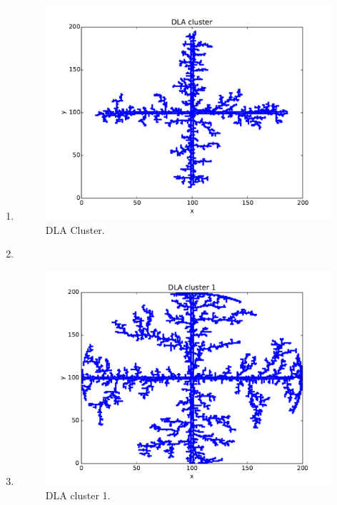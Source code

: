 \documentclass[aps,prl,preprint,superscriptaddress]{revtex4}
\begin{document}
\begin{enumerate}
\item
		\begin{figure}[H]
			\centering
			\includegraphics[width=1.0\textwidth]{dla.pdf}
			\caption{DLA Cluster.}
		\end{figure}
\item
\item
		\begin{figure}[H]
			\centering
			\includegraphics[width=1.0\textwidth]{dla_0.pdf}
			\caption{DLA cluster 1.}
		\end{figure}
				\begin{figure}[H]
			\centering

\end{figure}
\end{enumerate}
\end{document}
